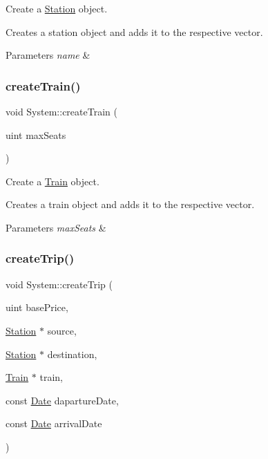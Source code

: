 Create a \mbox{\hyperlink{classStation}{Station}} object. 

Creates a station object and adds it to the respective vector.


\begin{DoxyParams}{Parameters}
{\em name} & \\
\hline
\end{DoxyParams}
\mbox{\label{classSystem_aa4cf09119e31e5bdf9d9187a7a60cd1a}} 
\subsubsection{\texorpdfstring{create\+Train()}{createTrain()}}
{\footnotesize\ttfamily void System\+::create\+Train (\begin{DoxyParamCaption}\item[{uint}]{max\+Seats }\end{DoxyParamCaption})}



Create a \mbox{\hyperlink{classTrain}{Train}} object. 

Creates a train object and adds it to the respective vector.


\begin{DoxyParams}{Parameters}
{\em max\+Seats} & \\
\hline
\end{DoxyParams}
\mbox{\label{classSystem_aea8519bf009400085f8e499891b7eb37}} 
\subsubsection{\texorpdfstring{create\+Trip()}{createTrip()}}
{\footnotesize\ttfamily void System\+::create\+Trip (\begin{DoxyParamCaption}\item[{uint}]{base\+Price,  }\item[{\mbox{\hyperlink{classStation}{Station}} $\ast$}]{source,  }\item[{\mbox{\hyperlink{classStation}{Station}} $\ast$}]{destination,  }\item[{\mbox{\hyperlink{classTrain}{Train}} $\ast$}]{train,  }\item[{const \mbox{\hyperlink{classDate}{Date}}}]{daparture\+Date,  }\item[{const \mbox{\hyperlink{classDate}{Date}}}]{arrival\+Date }\end{DoxyParamCaption})}



